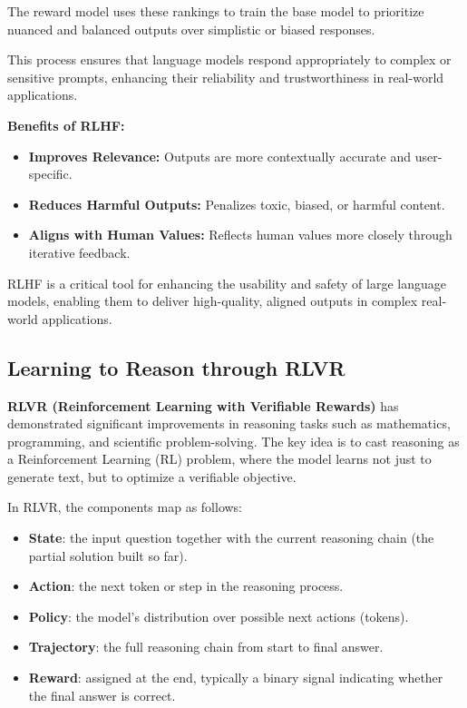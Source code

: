 The reward model uses these rankings to train the base model to prioritize nuanced and balanced outputs over simplistic or biased responses.

This process ensures that language models respond appropriately to complex or sensitive prompts, enhancing their reliability and trustworthiness in real-world applications. 

\textbf{Benefits of RLHF:}
\begin{itemize}
    \item \textbf{Improves Relevance:} Outputs are more contextually accurate and user-specific.
    \item \textbf{Reduces Harmful Outputs:} Penalizes toxic, biased, or harmful content.
    \item \textbf{Aligns with Human Values:} Reflects human values more closely through iterative feedback.
\end{itemize}

RLHF is a critical tool for enhancing the usability and safety of large language models, enabling them to deliver high-quality, aligned outputs in complex real-world applications.

\subsection{Learning to Reason through RLVR}

\textbf{RLVR (Reinforcement Learning with Verifiable Rewards)} has demonstrated significant improvements in reasoning tasks such as mathematics, programming, and scientific problem-solving. The key idea is to cast reasoning as a Reinforcement Learning (RL) problem, where the model learns not just to generate text, but to optimize a verifiable objective.  

In RLVR, the components map as follows:  
\begin{itemize}
    \item \textbf{State}: the input question together with the current reasoning chain (the partial solution built so far).  
    \item \textbf{Action}: the next token or step in the reasoning process.  
    \item \textbf{Policy}: the model’s distribution over possible next actions (tokens).  
    \item \textbf{Trajectory}: the full reasoning chain from start to final answer.  
    \item \textbf{Reward}: assigned at the end, typically a binary signal indicating whether the final answer is correct.  
\end{itemize}

